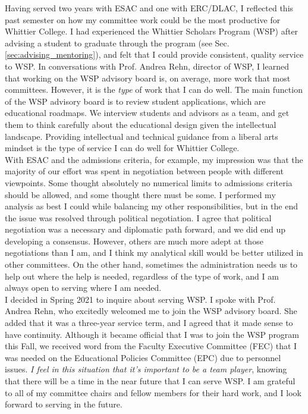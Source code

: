 \documentclass[../../../main.tex]{subfiles}
\begin{document}
Having served two years with ESAC and one with ERC/DLAC, I reflected this past semester on how my committee work could be the most productive for Whittier College.  I had experienced the Whittier Scholars Program (WSP) after advising a student to graduate through the program (see Sec. \ref{sec:advising_mentoring}), and felt that I could provide consistent, quality service to WSP.  In conversations with Prof. Andrea Rehn, director of WSP, I learned that working on the WSP advisory board is, on average, more work that most committees.  However, it is the \textit{type} of work that I can do well.  The main function of the WSP advisory board is to review student applications, which are educational roadmaps.  We interview students and advisors as a team, and get them to think carefully about the educational design given the intellectual landscape.  Providing intellectual and technical guidance from a liberal arts mindset is the type of service I can do well for Whittier College.
\\
\vspace{0.15cm}
With ESAC and the admissions criteria, for example, my impression was that the majority of our effort was spent in negotiation between people with different viewpoints.  Some thought absolutely no numerical limits to admissions criteria should be allowed, and some thought there must be some.  I performed my analysis as best I could while balancing my other responsibilities, but in the end the issue was resolved through political negotiation.  I agree that political negotiation was a necessary and diplomatic path forward, and we did end up developing a consensus.  However, others are much more adept at those negotiations than I am, and I think my analytical skill would be better utilized in other committees.  On the other hand, sometimes the administration needs us to help out where the help is needed, regardless of the type of work, and I am always open to serving where I am needed.
\\
\vspace{0.15cm}
I decided in Spring 2021 to inquire about serving WSP.  I spoke with Prof. Andrea Rehn, who excitedly welcomed me to join the WSP advisory board.  She added that it was a three-year service term, and I agreed that it made sense to have continuity.  Although it became official that I was to join the WSP program this Fall, we received word from the Faculty Executive Committee (FEC) that I was needed on the Educational Policies Committee (EPC) due to personnel issues.  \textit{I feel in this situation that it's important to be a team player}, knowing that there will be a time in the near future that I can serve WSP.  I am grateful to all of my committee chairs and fellow members for their hard work, and I look forward to serving in the future.
\end{document}
